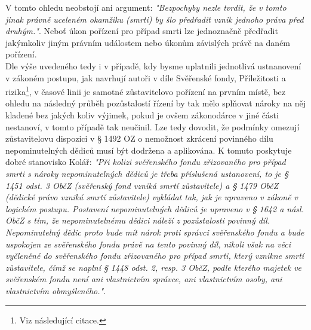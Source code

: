 \documentclass{article}
\begin{document}
 V tomto ohledu neobstojí ani argument: \textit{"Bezpochyby nezle tvrdit, že v tomto jinak právně uceleném okamžiku (smrti) by šlo předřadit vznik jednoho práva před druhým."}. Neboť úkon pořízení pro případ smrti lze jednoznačně předřadit jakýmkoliv jiným právním událostem nebo úkonům závislých právě na daném pořízení.\\
 
 
 
 Dle výše uvedeného tedy i v případě, kdy bysme uplatnili jednotlivá ustnanovení v zákoném postupu, jak navrhují autoři v díle Svěřenské fondy, Příležitosti a rizika\footnote{Viz následující citace.}, v časové linii je samotné zůstavitelovo pořízení na prvním místě, bez ohledu na následný průběh pozůstalostí řízení by tak mělo splňovat nároky na něj kladené bez jakých koliv výjimek, pokud je ovšem zákonodárce v jiné části nestanoví, v tomto případě tak neučinil. Lze tedy dovodit, že podmínky omezují zůstavitelovu dispozici v § 1492 OZ o nemožnost zkrácení povinného dílu nepominutelných dědiců musí být dodržena a aplikována. K tomuto poskytuje dobré stanovisko Kolář: \textit{"Při kolizi svěřenského fondu zřizovaného pro případ smrti s nároky nepominutelných dědiců je třeba příslušená ustanovení, to je § 1451 odst. 3 ObčZ (svěřenský fond vzniká smrtí zůstavitele) a § 1479 ObčZ (dědické právo vzniká smrtí zůstavitele) vykládat tak, jak je upraveno v zákoně v logickém postupu. Postavení nepominutelných dědiců je upraveno v § 1642 a násl. ObčZ s tím, že nepominutelnému dědici náleží z pozůstalosti povinný díl. Nepominutelný dědic proto bude mít nárok proti správci svěřenského fondu a bude uspokojen ze svěřenského fondu právě na tento povinný díl, nikoli však na věci vyčleněné do svěřenského fondu zřizovaného pro případ smrti, který vznikne smrtí zůstavitele, čímž se naplní § 1448 odst. 2, resp. 3 ObčZ, podle kterého majetek ve svěřenském fondu není ani vlastnictvím správce, ani vlastnictvím osoby, ani vlastnictvím obmyšleného."}.\\
 
\end{document}
